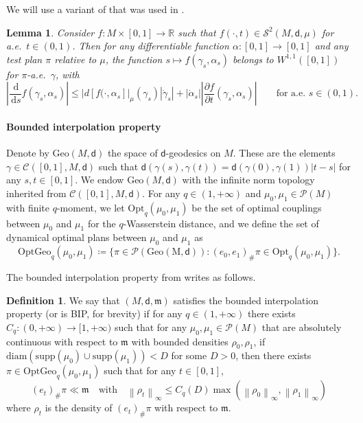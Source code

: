 \documentclass[10pt]{article}
\newcommand{\cC}{\mathcal{C}}
\newcommand{\m}{\mathfrak{m}}
\renewcommand{\d}{\,\mathrm{d}}
\newcommand{\dist}{\mathsf{d}}
\newcommand{\df}{\coloneqq}
\theoremstyle{plain}
\newtheorem{lemma}[theorem]{Lemma}
\theoremstyle{definition}
\newtheorem{definition}[theorem]{Definition}
\begin{document}
We will use a variant of \cite[Proposition 5.7]{AGSInv} that was used in \cite{GarofaloMondino-13}.


\begin{lemma}
Consider $f:M \times [0,1] \to \mathbb{R}$ such that $f(\cdot,t) \in  \mathcal{S}^2(M,\dist,\mu)$ for a.e.~$t\in (0,1)$. Then for any differentiable function $\alpha : [0,1] \to [0,1]$ and any test plan $\pi$ relative to $\mu$, the function $s \mapsto f(\gamma_s,\alpha_s)$ belongs to $W^{1,1}([0,1])$ for $\pi$-a.e.~$\gamma$, with
\[
\left| \frac{\d}{\d s} f(\gamma_s,\alpha_s)\right| \le |d[f(\cdot,\alpha_s]|_\mu (\gamma_s) |\dot{\gamma}_s| + |\dot\alpha_s| \left| \frac{\partial f}{\partial t} (\gamma_s,\alpha_s) \right|\qquad \text{for a.e.~$s\in (0,1)$.}
\]
\end{lemma}


\paragraph{Bounded interpolation property} Denote by $\mathrm{Geo}(M,\dist)$ the space of $\dist$-geodesics on $M$. These are the elements $\gamma \in \cC([0,1],M,\dist)$ such that $\dist(\gamma(s),\gamma(t)) = \dist(\gamma(0),\gamma(1)) |t-s|$ for any $s,t \in [0,1]$. We endow $\mathrm{Geo}(M,\dist)$ with the infinite norm topology inherited from $\cC([0,1],M,\dist)$.  For any $q \in (1,+\infty)$ and $\mu_0,\mu_1 \in \mathcal{P}(M)$ with finite $q$-moment, we let $\mathrm{Opt}_q(\mu_0,\mu_1)$ be the set of optimal couplings between $\mu_0$ and $\mu_1$ for the $q$-Wasserstein distance, and we define the set of dynamical optimal plans between $\mu_0$ and $\mu_1$ as
\[
\mathrm{OptGeo}_q(\mu_0,\mu_1) \df \{\pi \in \mathcal{P}(\mathrm{Geo(M,\dist)}) : (e_0,e_1)_\# \pi \in \mathrm{Opt}_q(\mu_0,\mu_1) \}.
\]

The bounded interpolation property  from \cite{GigliNobili} writes as follows.

\begin{definition}\label{Def:BIP}
    We say that $(M,\dist,\m)$ satisfies the bounded interpolation property (or is BIP, for brevity) if for any $q \in (1,+\infty)$ there exists $C_q : (0,+\infty) \to [1,+\infty)$ such that for any $\mu_0,\mu_1 \in \mathcal{P}(M)$ that are absolutely continuous with respect to $\m$ with bounded densities $\rho_0,\rho_1$, if $\mathrm{diam}(\mathrm{supp}(\mu_0) \cup \mathrm{supp}(\mu_1) ) < D$ for some $D>0$, then there exists $\pi \in \mathrm{OptGeo}_q(\mu_0,\mu_1)$ such that for any $t \in [0,1]$,
    \[
    (e_t)_\# \pi  \ll \m \quad \text{with} \quad \left\| \rho_t \right\|_\infty \le C_q(D)   \max \left( \left\| \rho_0\right\|_\infty,\left\| \rho_1 \right\|_\infty \right)
    \]
    where $\rho_t$ is the density of $(e_t)_\# \pi$ with respect to $\m$.
\end{definition}
\end{document}
